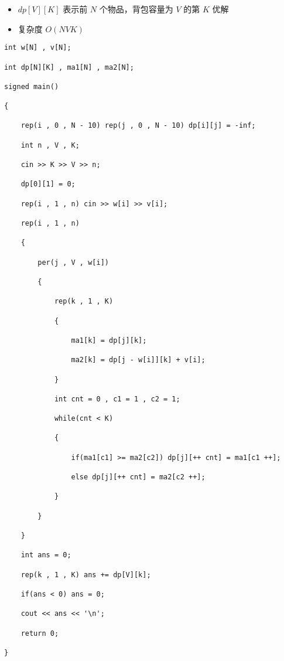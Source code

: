 \documentclass[E:/GsjzTle/main/main.tex]{subfiles}
\begin{document}
\begin{itemize}
\item
  \(dp[V][K]\) 表示前 \(N\) 个物品，背包容量为 \(V\) 的第 \(K\) 优解
\item
  复杂度 \(O(NVK)\)
\end{itemize}

\begin{lstlisting}
int w[N] , v[N];

int dp[N][K] , ma1[N] , ma2[N];

signed main()

{

	rep(i , 0 , N - 10) rep(j , 0 , N - 10) dp[i][j] = -inf;

	int n , V , K;

	cin >> K >> V >> n;

	dp[0][1] = 0; 

	rep(i , 1 , n) cin >> w[i] >> v[i];

	rep(i , 1 , n)

	{

		per(j , V , w[i])

		{

			rep(k , 1 , K)

			{

				ma1[k] = dp[j][k];

				ma2[k] = dp[j - w[i]][k] + v[i];	

			} 

			int cnt = 0 , c1 = 1 , c2 = 1;

			while(cnt < K)

			{

				if(ma1[c1] >= ma2[c2]) dp[j][++ cnt] = ma1[c1 ++];

				else dp[j][++ cnt] = ma2[c2 ++];  

			}

		}

	}

	int ans = 0;

	rep(k , 1 , K) ans += dp[V][k];

	if(ans < 0) ans = 0;

	cout << ans << '\n';

	return 0;

}
\end{lstlisting}
\end{document}
